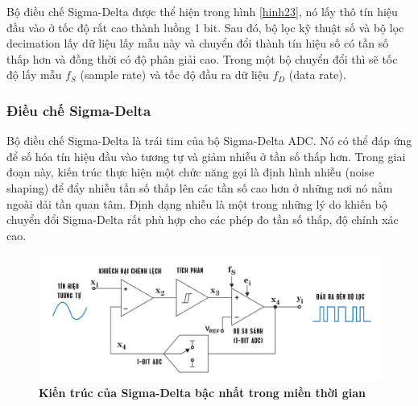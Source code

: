 Bộ điều chế Sigma-Delta được thể hiện trong hình \ref{hinh23}, nó lấy thô tín hiệu đầu vào ở tốc độ rất cao thành luồng 1 bit. Sau đó, bộ lọc kỹ thuật số và bộ lọc decimation lấy dữ liệu lấy mẫu này và chuyển đổi thành tín hiệu số có tần số thấp hơn và đồng thời có độ phân giải cao. Trong một bộ chuyển đổi thì sẽ tốc độ lấy mẫu $f_S$ (sample rate) và tốc độ đầu ra dữ liệu $f_D$ (data rate).

\subsubsection{Điều chế Sigma-Delta}
Bộ điều chế Sigma-Delta là trái tim của bộ Sigma-Delta ADC. Nó có thể đáp ứng để số hóa tín hiệu đầu vào tương tự và giảm nhiễu ở tần số thấp hơn. Trong giai đoạn này, kiến trúc thực hiện một chức năng gọi là định hình nhiễu (noise shaping) để đẩy nhiễu tần số thấp lên các tần số cao hơn ở những nơi nó nằm ngoài dải tần quan tâm. Định dạng nhiễu là một trong những lý do khiến bộ chuyển đổi Sigma-Delta rất phù hợp cho các phép đo tần số thấp, độ chính xác cao. \cite{Baker2011HowDA}
\begin{figure}[!ht]
    \centering
    \includegraphics[width=13cm]{Images/Chuong2/kientruc_1st.png}
    \caption[Kiến trúc của Sigma-Delta bậc nhất trong miền thời gian]{\bfseries \fontsize{12pt}{0pt}\selectfont Kiến trúc của Sigma-Delta bậc nhất trong miền thời gian}
    \label{hinh24}
\end{figure}

